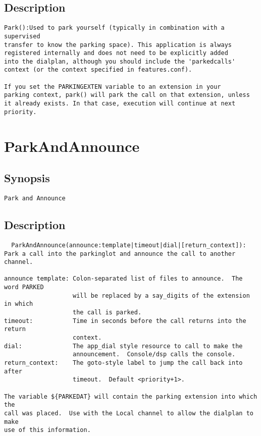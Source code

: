 \subsection{Description}
\begin{verbatim}
Park():Used to park yourself (typically in combination with a supervised
transfer to know the parking space). This application is always
registered internally and does not need to be explicitly added
into the dialplan, although you should include the 'parkedcalls'
context (or the context specified in features.conf).

If you set the PARKINGEXTEN variable to an extension in your
parking context, park() will park the call on that extension, unless
it already exists. In that case, execution will continue at next
priority.

\end{verbatim}


\section{ParkAndAnnounce}
\subsection{Synopsis}
\begin{verbatim}
Park and Announce
\end{verbatim}
\subsection{Description}
\begin{verbatim}
  ParkAndAnnounce(announce:template|timeout|dial|[return_context]):
Park a call into the parkinglot and announce the call to another channel.

announce template: Colon-separated list of files to announce.  The word PARKED
                   will be replaced by a say_digits of the extension in which
                   the call is parked.
timeout:           Time in seconds before the call returns into the return
                   context.
dial:              The app_dial style resource to call to make the
                   announcement.  Console/dsp calls the console.
return_context:    The goto-style label to jump the call back into after
                   timeout.  Default <priority+1>.

The variable ${PARKEDAT} will contain the parking extension into which the
call was placed.  Use with the Local channel to allow the dialplan to make
use of this information.

\end{verbatim}


